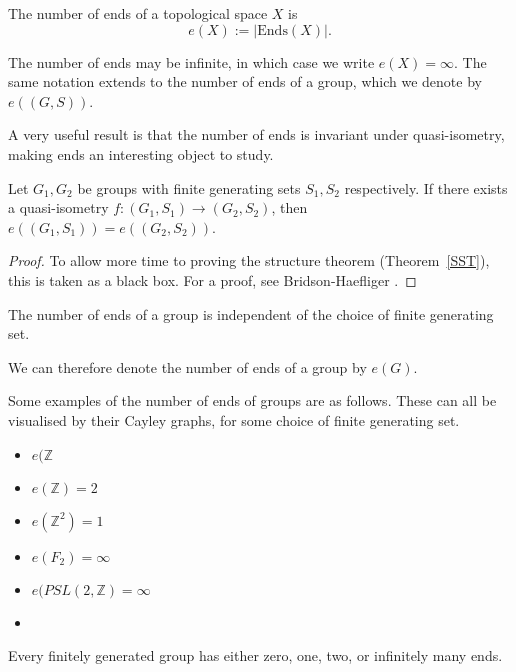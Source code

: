 \begin{definition}
    The number of ends of a topological space \(X\) is 
    \[
        e(X) := |\mathrm{Ends}(X)|.
    \]
\end{definition}

The number of ends may be infinite, in which case we write \(e(X) = \infty\). The same notation extends to the number of ends of a group, which we denote by \(e((G,S))\). 

A very useful result is that the number of ends is invariant under quasi-isometry, making ends an interesting object to study. 

\begin{theorem}
    Let \(G_1,G_2\) be groups with finite generating sets \(S_1,S_2\) respectively. If there exists a quasi-isometry \(f: (G_1, S_1) \to (G_2,S_2)\), then \(e((G_1,S_1)) = e((G_2,S_2))\).
\end{theorem}

\begin{proof}
    To allow more time to proving the structure theorem (Theorem~\ref{SST}), this is taken as a black box. For a proof, see Bridson-Haefliger \cite[p.~145]{bridson_haefliger_metric_1999}.
\end{proof}

\begin{corollary}
    The number of ends of a group is independent of the choice of finite generating set.
\end{corollary}

We can therefore denote the number of ends of a group by \(e(G)\). 

\begin{example}
    Some examples of the number of ends of groups are as follows. These can all be visualised by their Cayley graphs, for some choice of finite generating set.
    \begin{itemize}
        \item \(e(\mathbb{Z}\)
        \item \(e(\mathbb{Z}) = 2\)
        \item \(e(\mathbb{Z}^2) = 1\)
        \item \(e(F_2) = \infty\)
        \item \(e(PSL(2,\mathbb{Z}) = \infty\)
        \item 
    \end{itemize}
\end{example}

\begin{theorem}
\label{FH}
    Every finitely generated group has either zero, one, two, or infinitely many ends.
\end{theorem}

